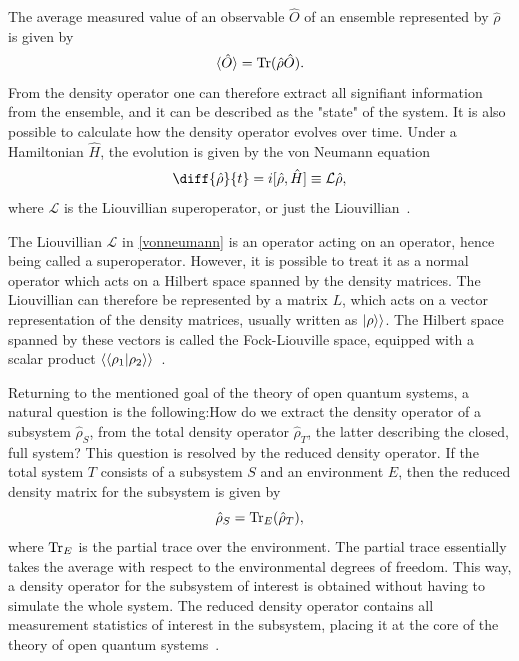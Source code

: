 \documentclass[../main.tex]{subfiles}
\begin{document}
The average measured value of an observable $\hat O$ of an ensemble represented by $\hat\rho$ is given by
\begin{equation}\label{eq:expec}
    \braket{\hat O} = \operatorname{Tr}({\hat\rho \hat O}).
\end{equation}
From the density operator one can therefore extract all signifiant information from the ensemble, and it can be described as the "state" of the system. It is also possible to calculate how the density operator evolves over time. Under a Hamiltonian $\hat H$, the evolution is given by the von Neumann equation
\begin{equation}\label{vonneumann}
    \diff{\hat\rho}{t} = i[\hat \rho, \hat H] \equiv \mathcal{L}\hat\rho,
\end{equation}
where $\mathcal{L}$ is the Liouvillian superoperator, or just the Liouvillian~\cite{bookopen}. 

The Liouvillian $\mathcal{L}$ in \cref{vonneumann} is an operator acting on an operator, hence being called a superoperator. However, it is possible to treat it as a normal operator which acts on a Hilbert space spanned by the density matrices. The Liouvillian can therefore be represented by a matrix $L$, which acts on a vector representation of the density matrices, usually written as $\ket{\rho}\rangle$. The Hilbert space spanned by these vectors is called the Fock-Liouville space, equipped with a scalar product $\langle\braket{\rho_1|\rho_2}\rangle$~\cite{lindblad}. 

Returning to the mentioned goal of the theory of open quantum systems, a natural question is the following:How do we extract the density operator of a subsystem $\hat\rho_S$, from the total density operator $\hat\rho_T$, the latter describing the closed, full system? This question is resolved by the reduced density operator. If the total system $T$ consists of a subsystem $S$ and an environment $E$, then the reduced density matrix for the subsystem is given by
\begin{equation}
    \hat\rho_S = \operatorname{Tr}_E({\hat\rho_T}),
\end{equation}
where $\operatorname{Tr}_E$ is the partial trace over the environment. The partial trace essentially takes the average with respect to the environmental degrees of freedom. This way, a density operator for the subsystem of interest is obtained without having to simulate the whole system. The reduced density operator contains all measurement statistics of interest in the subsystem, placing it at the core of the theory of open quantum systems~\cite{bookopen}.
\end{document}
